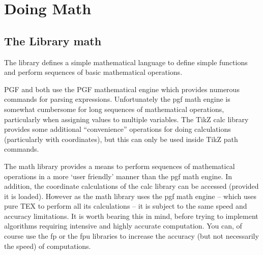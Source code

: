 \documentclass[twoside,11pt]{book}
\begin{document}
\pagecolor{thecodebackground}
\color{black!80}
\mainmatter
{}
\chapter{Doing Math}
%

\bgroup
\centering


\egroup

\section{The \tikzname Library math}

The library defines a simple mathematical language to define simple functions and perform sequences
of basic mathematical operations.

PGF and \tikzname both use the PGF mathematical engine which provides numerous commands for parsing expressions. 
Unfortunately the pgf math engine is somewhat cumbersome for long sequences of mathematical operations,
particularly when assigning values to multiple variables. The TikZ calc library provides some additional
“convenience” operations for doing calculations (particularly with coordinates), but this can only be used
inside TikZ path commands.

The math library provides a means to perform sequences of mathematical operations in a more ‘user
friendly’ manner than the pgf math engine. In addition, the coordinate calculations of the calc library can
be accessed (provided it is loaded). However as the math library uses the pgf math engine – which uses
pure TEX to perform all its calculations – it is subject to the same speed and accuracy limitations. It is
worth bearing this in mind, before trying to implement algorithms requiring intensive and highly accurate
computation. You can, of course use the fp or the fpu libraries to increase the accuracy (but not necessarily
the speed) of computations.
\end{document}
